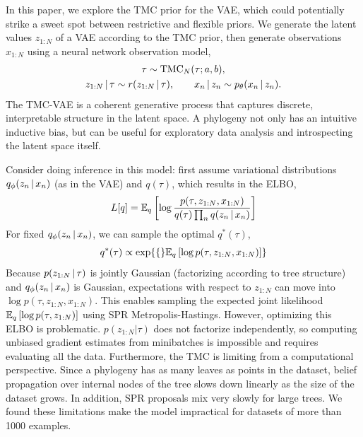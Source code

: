 In this paper, we explore the TMC prior for the VAE, which could potentially strike a sweet spot between restrictive and flexible priors.
We generate the latent values $z_{1:N}$ of a VAE according to the TMC prior, then generate observations $x_{1:N}$ using a neural network observation model,
\begin{gather}
        \tau \sim \mathrm{TMC}_N(\tau; a, b), \\
        z_{1:N} \,|\, \tau \sim r(z_{1:N} \,|\, \tau),
        \qquad
        x_n \,|\, z_n \sim p_\theta(x_n \,|\, z_n).
\end{gather}
The TMC-VAE is a coherent
generative process that captures
discrete, interpretable structure in the latent space.
A phylogeny not only has an intuitive inductive bias,
but can be useful for
exploratory data analysis
and introspecting the latent space itself.

Consider doing inference in this model:
first assume variational distributions 
$q_\phi(z_n \,|\, x_n)$ (as in the VAE)
and $q(\tau)$, which results in the
ELBO,
\begin{equation}
    \begin{split}
    L[q] &= \mathbb{E}_q\left[\log \frac{p(\tau, z_{1:N}, x_{1:N})}{q(\tau)\prod_n q(z_n \,|\, x_n)}\right] \\
    \end{split}
\end{equation}
For fixed $q_\phi(z_n \,|\, x_n)$, we can
sample the optimal $q^*(\tau)$,
\begin{equation}
    q^*(\tau) \propto \exp\{\E_q\left[\log p(\tau, z_{1:N}, x_{1:N})\right]\}
\end{equation}
Because $p(z_{1:N} \,|\, \tau)$ is jointly Gaussian (factorizing
according to tree structure) and $q_\phi(z_n \,|\, x_n)$ is Gaussian, 
expectations with respect to $z_{1:N}$
can move into $\log p(\tau, z_{1:N}, x_{1:N})$. This
enables sampling the expected joint likelihood $\mathbb{E}_q\left[\log p(\tau, z_{1:N})\right]$
using SPR Metropolis-Hastings.
However, optimizing this ELBO is problematic.
$p(z_{1:N} | \tau)$
does not factorize independently, so computing
unbiased gradient estimates from minibatches is impossible
and requires evaluating all the data.
Furthermore, the TMC is limiting
from a computational perspective.
Since a phylogeny has as many leaves
as points in the dataset, 
belief propagation over internal nodes
of the tree slows down linearly as 
the size of the dataset grows.
In addition,
SPR proposals mix very slowly for large trees.
We found these limitations 
make the model impractical for datasets
of more than 1000 examples.

